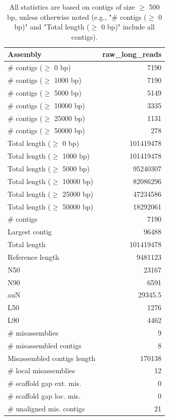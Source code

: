 \documentclass[12pt,a4paper]{article}
\begin{document}
\begin{table}[ht]
\begin{center}
\caption{All statistics are based on contigs of size $\geq$ 500 bp, unless otherwise noted (e.g., "\# contigs ($\geq$ 0 bp)" and "Total length ($\geq$ 0 bp)" include all contigs).}
\begin{tabular}{|l*{1}{|r}|}
\hline
Assembly & raw\_long\_reads \\ \hline
\# contigs ($\geq$ 0 bp) & 7190 \\ \hline
\# contigs ($\geq$ 1000 bp) & 7190 \\ \hline
\# contigs ($\geq$ 5000 bp) & 5149 \\ \hline
\# contigs ($\geq$ 10000 bp) & 3335 \\ \hline
\# contigs ($\geq$ 25000 bp) & 1131 \\ \hline
\# contigs ($\geq$ 50000 bp) & 278 \\ \hline
Total length ($\geq$ 0 bp) & 101419478 \\ \hline
Total length ($\geq$ 1000 bp) & 101419478 \\ \hline
Total length ($\geq$ 5000 bp) & 95240307 \\ \hline
Total length ($\geq$ 10000 bp) & 82086296 \\ \hline
Total length ($\geq$ 25000 bp) & 47234586 \\ \hline
Total length ($\geq$ 50000 bp) & 18292061 \\ \hline
\# contigs & 7190 \\ \hline
Largest contig & 96488 \\ \hline
Total length & 101419478 \\ \hline
Reference length & 9481123 \\ \hline
N50 & 23167 \\ \hline
N90 & 6591 \\ \hline
auN & 29345.5 \\ \hline
L50 & 1276 \\ \hline
L90 & 4462 \\ \hline
\# misassemblies & 9 \\ \hline
\# misassembled contigs & 8 \\ \hline
Misassembled contigs length & 170138 \\ \hline
\# local misassemblies & 12 \\ \hline
\# scaffold gap ext. mis. & 0 \\ \hline
\# scaffold gap loc. mis. & 0 \\ \hline
\# unaligned mis. contigs & 21 \\ \hline

\end{tabular}
\end{center}
\end{table}
\end{document}
